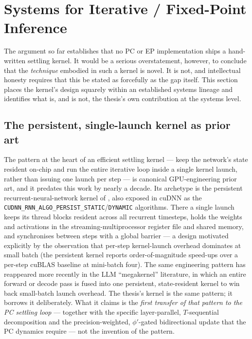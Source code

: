 \section{Systems for Iterative / Fixed-Point Inference}

The argument so far establishes that no PC or EP implementation ships a hand-written
settling kernel. It would be a serious overstatement, however, to conclude that the
\emph{technique} embodied in such a kernel is novel. It is not, and intellectual honesty
requires that this be stated as forcefully as the gap itself. This section places the
kernel's design squarely within an established systems lineage and identifies what is, and
is not, the thesis's own contribution at the systems level.

\subsection{The persistent, single-launch kernel as prior art}

The pattern at the heart of an efficient settling kernel --- keep the network's state
resident on-chip and run the entire iterative loop inside a single kernel launch, rather
than issuing one launch per step --- is canonical GPU-engineering prior art, and it predates
this work by nearly a decade. Its archetype is the persistent recurrent-neural-network
kernel of \citet{diamos2016persistent}, also exposed in cuDNN as the
\texttt{CUDNN\_RNN\_ALGO\_PERSIST\_STATIC}/\texttt{DYNAMIC} algorithms. There a single launch
keeps its thread blocks resident across all recurrent timesteps, holds the weights and
activations in the streaming-multiprocessor register file and shared memory, and
synchronises between steps with a global barrier --- a design motivated explicitly by the
observation that per-step kernel-launch overhead dominates at small batch (the persistent
kernel reports order-of-magnitude speed-ups over a per-step cuBLAS baseline at mini-batch
four). The same engineering pattern has reappeared more recently in the LLM ``megakernel''
literature, in which an entire forward or decode pass is fused into one persistent,
state-resident kernel to win back small-batch launch overhead. The thesis's kernel is the
same pattern; it borrows it deliberately. What it claims is the \emph{first transfer of that
pattern to the PC settling loop} --- together with the specific layer-parallel,
$T$-sequential decomposition and the precision-weighted, $\phi'$-gated bidirectional update
that the PC dynamics require --- not the invention of the pattern.

